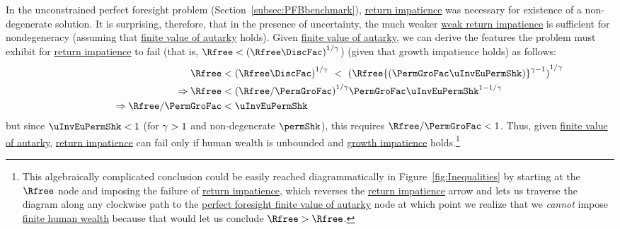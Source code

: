 \documentclass[\econtexRoot/BufferStockTheory]{subfiles}
\begin{document}
In the unconstrained perfect foresight problem (Section~\ref{subsec:PFBbenchmark}), \hyperlink{RIC}{return impatience} was necessary for existence of a non-degenerate solution.
It is surprising, therefore, that in the presence of uncertainty, the much weaker \hyperlink{WRIC}{weak return impatience} is sufficient for nondegeneracy (assuming that \hyperlink{FVAC}{finite value of autarky}  holds).
Given \hyperlink{FVAC}{finite value of autarky}, we can derive the features the problem must exhibit for \hyperlink{RIC}{return impatience} to fail (that is, $\Rfree < {(\Rfree \DiscFac)}^{1/\CRRA}$) (given that growth impatience holds) as follows:
%
\begin{equation}\label{eq:RICimplies}
  \begin{aligned}
    \Rfree   & < {(\Rfree \DiscFac)}^{1/\CRRA} ~ < ~ {(\Rfree {(\PermGroFac \uInvEuPermShk)}^{\CRRA-1})}^{1/\CRRA}
    \\ \Rightarrow \Rfree   & < {(\Rfree/\PermGroFac)}^{1/\CRRA}\PermGroFac \uInvEuPermShk^{1-1/\CRRA}
    \\  \qquad\qquad\qquad \Rightarrow  \Rfree/\PermGroFac  & < \uInvEuPermShk
  \end{aligned}
\end{equation}
%
but since $\uInvEuPermShk < 1$ (for $\gamma>1$ and non-degenerate $\permShk$), this requires $\Rfree/\PermGroFac < 1$.
Thus, given \hyperlink{FVAC}{finite value of autarky}, \hyperlink{RIC}{return impatience} can fail only if human wealth is unbounded and \hyperlink{GICRaw}{growth impatience} holds.\footnote{This algebraically complicated conclusion could be easily reached diagrammatically in Figure~\ref{fig:Inequalities} by starting at the $\Rfree$ node and imposing the failure of \hyperlink{RIC}{return impatience}, which reverses the \hyperlink{RIC}{return impatience} arrow and lets us traverse the diagram along any clockwise path to the \hyperlink{PFFVAC}{perfect foresight finite value of autarky} node at which point we realize that we \textit{cannot} impose \hyperlink{FHWC}{finite human wealth} because that would let us conclude $\Rfree > \Rfree$.}
\end{document}
